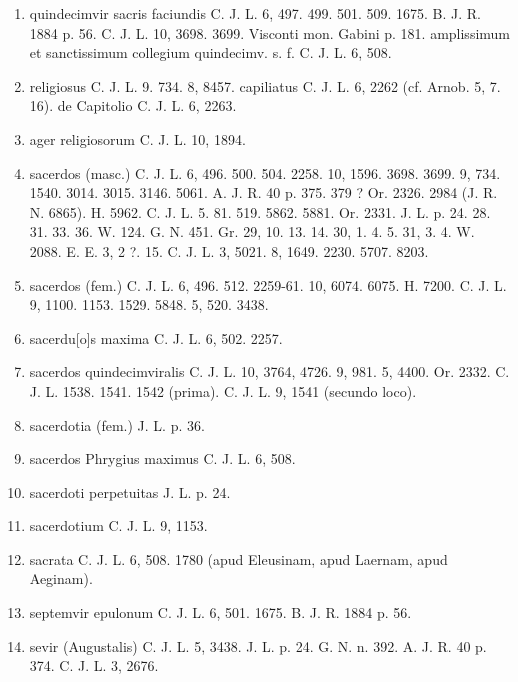 \documentclass[a4paper, 11pt, oneside, polutonikogreek, german, twocolumn]{article}
\begin{document}
\begin{enumerate}
\item quindecimvir sacris faciundis C. J. L. 6, 497. 499. 501. 509. 1675. B. J. R. 1884 p. 56. C. J. L. 10, 3698. 3699. Visconti mon. Gabini p. 181. amplissimum et sanctissimum collegium quindecimv. s. f. C. J. L. 6, 508.

\item religiosus C. J. L. 9. 734. 8, 8457. capiliatus C. J. L. 6, 2262 (cf. Arnob. 5, 7. 16). de Capitolio C. J. L. 6, 2263.

\item ager religiosorum C. J. L. 10, 1894.

\item sacerdos (masc.) C. J. L. 6, 496. 500. 504. 2258. 10, 1596. 3698. 3699. 9, 734. 1540. 3014. 3015. 3146. 5061. A. J. R. 40 p. 375. 379 ? Or. 2326. 2984 (J. R. N. 6865). H. 5962. C. J. L. 5. 81. 519. 5862. 5881. Or. 2331. J. L. p. 24. 28. 31. 33. 36. W. 124. G. N. 451. Gr. 29, 10. 13. 14. 30, 1. 4. 5. 31, 3. 4. W. 2088. E. E. 3, 2 ?. 15. C. J. L. 3, 5021. 8, 1649. 2230. 5707. 8203.

\item sacerdos (fem.) C. J. L. 6, 496. 512. 2259-61. 10, 6074. 6075. H. 7200. C. J. L. 9, 1100. 1153. 1529. 5848. 5, 520. 3438.

\item sacerdu[o]s maxima C. J. L. 6, 502. 2257.

\item sacerdos quindecimviralis C. J. L. 10, 3764, 4726. 9, 981. 5, 4400. Or. 2332. C. J. L. 1538. 1541. 1542 (prima). C. J. L. 9, 1541 (secundo loco).

\item sacerdotia (fem.) J. L. p. 36.

\item sacerdos Phrygius maximus C. J. L. 6, 508.

\item sacerdoti perpetuitas J. L. p. 24.

\item sacerdotium C. J. L. 9, 1153.

\item sacrata C. J. L. 6, 508. 1780 (apud Eleusinam, apud Laernam, apud Aeginam).

\item septemvir epulonum C. J. L. 6, 501. 1675. B. J. R. 1884 p. 56.

\item sevir (Augustalis) C. J. L. 5, 3438. J. L. p. 24. G. N. n. 392. A. J. R. 40 p. 374. C. J. L. 3, 2676.


\end{enumerate}
\end{document}
